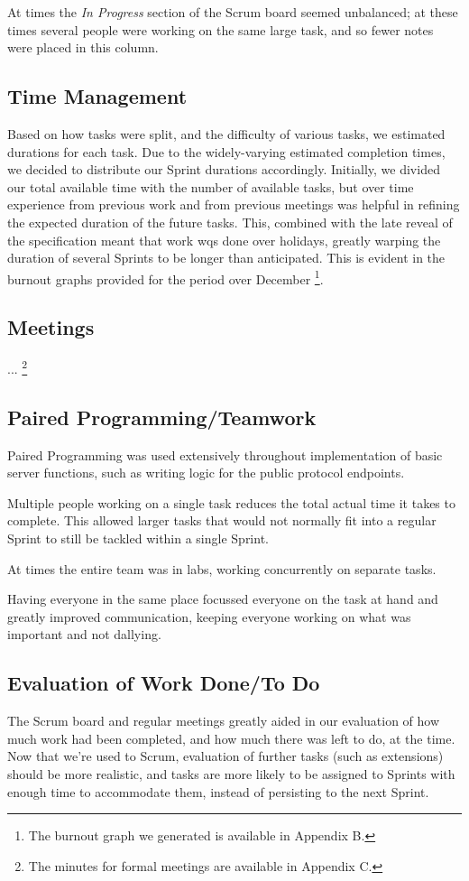 \documentclass{article}
\begin{document}
At times the \emph{In Progress} section of the Scrum board seemed unbalanced;
at these times several people were working on the same large task, and so fewer
notes were placed in this column.

\subsection{Time Management}
Based on how tasks were split, and the difficulty of various tasks, we estimated
durations for each task. Due to the widely-varying estimated completion times,
we decided to distribute our Sprint durations accordingly.
Initially, we divided our total available time with the number of available tasks,
but over time experience from previous work and from previous meetings was helpful in
refining the expected duration of the future tasks.
This, combined with
the late reveal of the specification meant that work wqs done over holidays, greatly 
warping the duration of several Sprints to be longer than anticipated. This is
evident in the burnout graphs provided for the period over December%
\footnote{The burnout graph we generated is available in Appendix B.}.

\subsection{Meetings}
...
\footnote{The minutes for formal meetings are available in Appendix C.}

\subsection{Paired Programming/Teamwork}
Paired Programming was used extensively throughout implementation of basic server
functions, such as writing logic for the public protocol endpoints.

Multiple people working on a single task reduces the total actual time it takes to
complete. This allowed larger tasks that would not normally fit into a regular Sprint
to still be tackled within a single Sprint.

At times the entire team was in labs, working concurrently on separate tasks.

Having everyone in the same place focussed everyone on the task at hand and greatly
improved communication, keeping everyone working on what was important and not dallying.

\subsection{Evaluation of Work Done/To Do}
The Scrum board and regular meetings greatly aided in our evaluation of how much work
had been completed, and how much there was left to do, at the time. Now that we're
used to Scrum, evaluation of further tasks (such as extensions) should be more
realistic, and tasks are more likely to be assigned to Sprints with enough time to
accommodate them, instead of persisting to the next Sprint.
\end{document}
